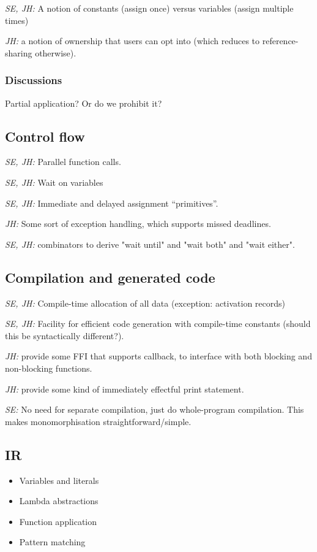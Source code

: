 \documentclass{article}
\begin{document}
\textit{SE, JH:} A notion of constants (assign once) versus variables (assign
multiple times)

\textit{JH:} a notion of ownership that users can opt into (which reduces to
reference-sharing otherwise).

\subsubsection{Discussions}

Partial application?  Or do we prohibit it?

\subsection{Control flow}

\textit{SE, JH:} Parallel function calls.

\textit{SE, JH:} Wait on variables

\textit{SE, JH:} Immediate and delayed assignment ``primitives''.

\textit{JH:} Some sort of exception handling, which supports missed deadlines.

\textit{SE, JH:} combinators to derive "wait until" and "wait both" and "wait either".

\subsection{Compilation and generated code}

\textit{SE, JH:} Compile-time allocation of all data (exception: activation records)

\textit{SE, JH:} Facility for efficient code generation with compile-time
constants (should this be syntactically different?).

\textit{JH:} provide some FFI that supports callback, to interface with both
blocking and non-blocking functions.

\textit{JH:} provide some kind of immediately effectful print statement.

\textit{SE:} No need for separate compilation, just do whole-program
compilation. This makes monomorphisation straightforward/simple.

\subsection{IR}

\begin{itemize}
\item Variables and literals
\item Lambda abstractions
\item Function application
\item Pattern matching
\end{itemize}
\end{document}

